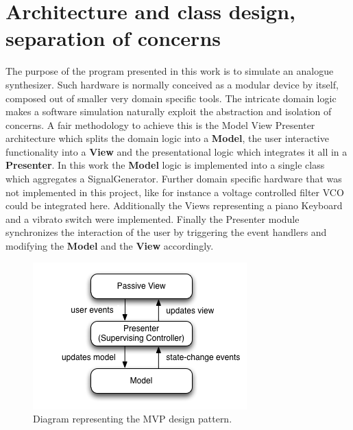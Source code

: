 \documentclass[margin,line,a4paper,authoryear,12pt]{report}
\begin{document}
\section{Architecture and class design, separation of concerns\cite{CleanCodeBook}}
The purpose of the program presented in this work is to simulate an analogue synthesizer. Such hardware is normally conceived as a
modular device by itself, composed out of smaller very domain specific tools. The intricate domain logic makes a software simulation
naturally exploit the abstraction and isolation of concerns. A fair methodology to achieve this is the Model View Presenter architecture 
which splits the domain logic into a \textbf{Model}, the user interactive functionality into a \textbf{View} and the presentational logic which integrates 
it all in a \textbf{Presenter}. In this work the \textbf{Model} logic is implemented into a single class which aggregates a SignalGenerator. Further
domain specific hardware that was not implemented in this project, like for instance a voltage controlled filter VCO could be integrated here.
Additionally the Views representing a piano Keyboard and a vibrato switch were implemented. Finally the Presenter module synchronizes the interaction
of the user by triggering the event handlers and modifying the \textbf{Model} and the \textbf{View} accordingly.
\begin{figure}[h!]
    \centering
    \includegraphics[width=0.5\linewidth]{MVP.png}
    \caption{Diagram representing the MVP design pattern\cite{MVP}.}
    \label{fig:MVP}
\end{figure}
\end{document}
